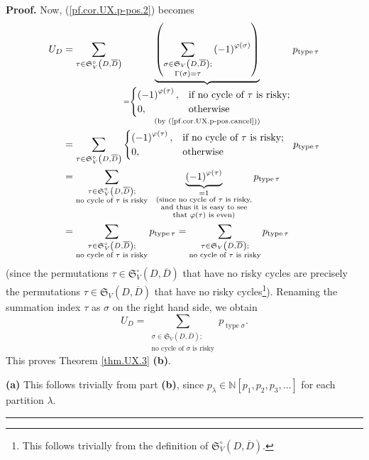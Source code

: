 \documentclass[numbers=enddot,12pt,final,onecolumn,notitlepage]{scrartcl}%
\numberwithin{exer}{section}
\theoremstyle{definition}
\newenvironment{proof}[1][Proof]{\noindent\textbf{#1.} }{\ \rule{0.5em}{0.5em}}
\let\sumnonlimits\sum
\renewcommand{\sum}{\sumnonlimits\limits}
\begin{document}
\begin{proof}
Now, (\ref{pf.cor.UX.p-pos.2}) becomes%
\begin{align*}
U_{D}  &  =\sum_{\tau\in\mathfrak{S}_{V}^{\circ}\left(  D,\overline{D}\right)
}\underbrace{\left(  \sum_{\substack{\sigma\in\mathfrak{S}_{V}\left(
D,\overline{D}\right)  ;\\\Gamma\left(  \sigma\right)  =\tau}}\left(
-1\right)  ^{\varphi\left(  \sigma\right)  }\right)  }_{\substack{=%
\begin{cases}
\left(  -1\right)  ^{\varphi\left(  \tau\right)  }, & \text{if no cycle of
}\tau\text{ is risky};\\
0, & \text{otherwise}%
\end{cases}
\\\text{(by (\ref{pf.cor.UX.p-pos.cancel}))}}}p_{\operatorname*{type}\tau}\\
&  =\sum_{\tau\in\mathfrak{S}_{V}^{\circ}\left(  D,\overline{D}\right)  }%
\begin{cases}
\left(  -1\right)  ^{\varphi\left(  \tau\right)  }, & \text{if no cycle of
}\tau\text{ is risky};\\
0, & \text{otherwise}%
\end{cases}
\ \ p_{\operatorname*{type}\tau}\\
&  =\sum_{\substack{\tau\in\mathfrak{S}_{V}^{\circ}\left(  D,\overline
{D}\right)  ;\\\text{no cycle of }\tau\text{ is risky}}%
}\ \ \underbrace{\left(  -1\right)  ^{\varphi\left(  \tau\right)  }%
}_{\substack{=1\\\text{(since no cycle of }\tau\text{ is risky,}\\\text{and
thus it is easy to see}\\\text{that }\varphi\left(  \tau\right)  \text{ is
even)}}}p_{\operatorname*{type}\tau}\\
&  =\sum_{\substack{\tau\in\mathfrak{S}_{V}^{\circ}\left(  D,\overline
{D}\right)  ;\\\text{no cycle of }\tau\text{ is risky}}%
}p_{\operatorname*{type}\tau}=\sum_{\substack{\tau\in\mathfrak{S}_{V}\left(
D,\overline{D}\right)  ;\\\text{no cycle of }\tau\text{ is risky}%
}}p_{\operatorname*{type}\tau}%
\end{align*}
(since the permutations $\tau\in\mathfrak{S}_{V}^{\circ}\left(  D,\overline
{D}\right)  $ that have no risky cycles are precisely the permutations
$\tau\in\mathfrak{S}_{V}\left(  D,\overline{D}\right)  $ that have no risky
cycles\footnote{This follows trivially from the definition of $\mathfrak{S}%
_{V}^{\circ}\left(  D,\overline{D}\right)  $.}). Renaming the summation index
$\tau$ as $\sigma$ on the right hand side, we obtain%
\[
U_{D}=\sum_{\substack{\sigma\in\mathfrak{S}_{V}\left(  D,\overline{D}\right)
;\\\text{no cycle of }\sigma\text{ is risky}}}p_{\operatorname*{type}\sigma}.
\]
This proves Theorem \ref{thm.UX.3} \textbf{(b)}.

\textbf{(a)} This follows trivially from part \textbf{(b)}, since $p_{\lambda
}\in\mathbb{N}\left[  p_{1},p_{2},p_{3},\ldots\right]  $ for each partition
$\lambda$.
\end{proof}
\end{document}
